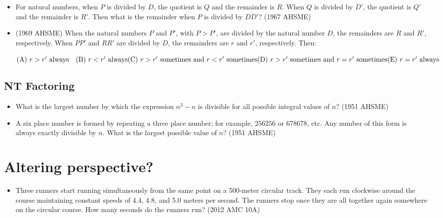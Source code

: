 \documentclass{article}
\begin{document}
\begin{itemize}

\item For natural numbers, when $P$ is divided by $D$, the quotient is $Q$ and the remainder is $R$.  When $Q$ is divided by $D'$, the quotient is $Q'$ and the remainder is $R'$.  Then what is the remainder when $P$ is divided by $DD'$? (1967 AHSME)

\item (1969 AHSME) When the natural numbers $P$ and $P'$, with $P>P'$, are divided by the natural number $D$, the remainders are $R$ and $R'$, respectively. When $PP'$ and $RR'$ are divided by $D$, the remainders are $r$ and $r'$, respectively. Then:

$\text{(A) } r>r' \text{  always}\quad
\text{(B) } r<r' \text{  always}\quad\\
\text{(C) } r>r' \text{  sometimes and } r<r' \text{  sometimes}\quad\\
\text{(D) } r>r' \text{  sometimes and } r=r' \text{  sometimes}\quad\\
\text{(E) } r=r' \text{  always}$

\end{itemize}


\subsection{NT Factoring}

\begin{itemize}

\item What is the largest number by which the expression $n^3 - n$ is divisible for all possible integral values of $n$? (1951 AHSME)

\item A six place number is formed by repeating a three place number; for example, $ 256256$ or $ 678678$, etc. Any number of this form is always exactly divisible by $n$. What is the largest possible value of $n$? (1951 AHSME)

\end{itemize}

\section{Altering perspective?}

\begin{itemize}

\item Three runners start running simultaneously from the same point on a 500-meter circular track. They each run clockwise around the course maintaining constant speeds of 4.4, 4.8, and 5.0 meters per second. The runners stop once they are all together again somewhere on the circular course. How many seconds do the runners run? (2012 AMC 10A)




\end{itemize}
\end{document}
